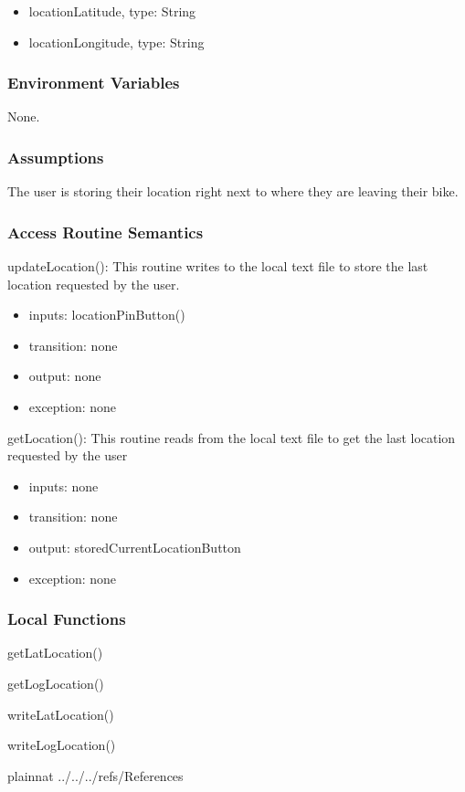 \documentclass[12pt, titlepage]{article}
\begin{document}
\begin{itemize}
\item locationLatitude, type: String
\item locationLongitude, type: String
\end{itemize}


\subsubsection{Environment Variables}

None.


\subsubsection{Assumptions}

The user is storing their location right next to where they are leaving their bike. 

\subsubsection{Access Routine Semantics}

\noindent updateLocation():
This routine writes to the local text file to store the last location requested by the user.
\begin{itemize}
\item inputs: locationPinButton()
\item transition: none
\item output: none
\item exception: none
\end{itemize}

\noindent getLocation():
This routine reads from the local text file to get the last location requested by the user
\begin{itemize}
\item inputs: none
\item transition: none
\item output: storedCurrentLocationButton
\item exception: none
\end{itemize}

\subsubsection{Local Functions}

\item getLatLocation()
\item getLogLocation()
\item writeLatLocation()
\item writeLogLocation()


\newpage

 {plainnat}
 {../../../refs/References}



\end{document}
